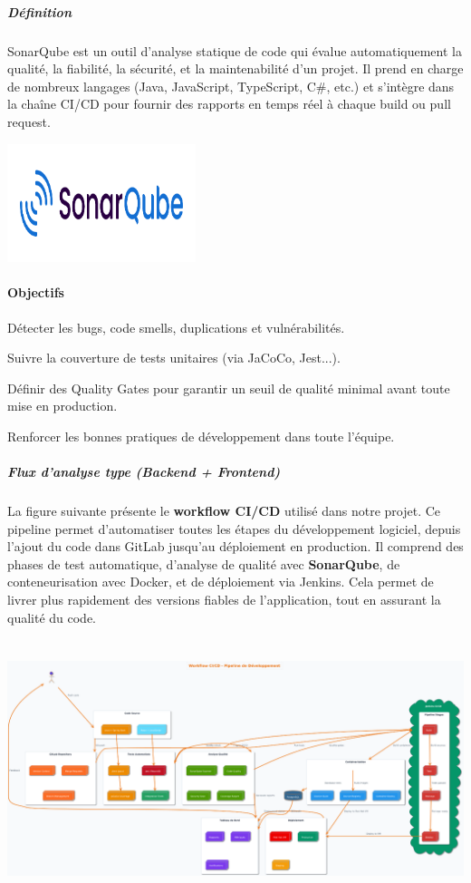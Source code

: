 \documentclass[12pt,a4paper,twoside]{report}
\begin{document}
\hypertarget{duxe9finition}{%
\subparagraph{Définition}\label{duxe9finition}}

SonarQube est un outil d'analyse statique de code qui évalue
automatiquement la qualité, la fiabilité, la sécurité, et la
maintenabilité d'un projet. Il prend en charge de nombreux langages
(Java, JavaScript, TypeScript, C\#, etc.) et s'intègre dans la chaîne
CI/CD pour fournir des rapports en temps réel à chaque build ou pull
request.

\includegraphics[width=2.17222in,height=1.36111in]{latex_media/media/image41.png}

\hypertarget{objectifs}{%
\paragraph{\texorpdfstring{ Objectifs}{ Objectifs}}\label{objectifs}}

Détecter les bugs, code smells, duplications et vulnérabilités.

Suivre la couverture de tests unitaires (via JaCoCo, Jest...).

Définir des Quality Gates pour garantir un seuil de qualité minimal
avant toute mise en production.

Renforcer les bonnes pratiques de développement dans toute l'équipe.

\hypertarget{flux-danalyse-type-backend-frontend}{%
\subparagraph{Flux d'analyse type (Backend +
Frontend)}\label{flux-danalyse-type-backend-frontend}}

La figure suivante présente le \textbf{workflow CI/CD} utilisé dans
notre projet. Ce pipeline permet d'automatiser toutes les étapes du
développement logiciel, depuis l'ajout du code dans GitLab jusqu'au
déploiement en production. Il comprend des phases de test automatique,
d'analyse de qualité avec \textbf{SonarQube}, de conteneurisation avec
Docker, et de déploiement via Jenkins. Cela permet de livrer plus
rapidement des versions fiables de l'application, tout en assurant la
qualité du code.

\includegraphics[width=6.29921in,height=2.96457in]{latex_media/media/image42.png}
\end{document}
